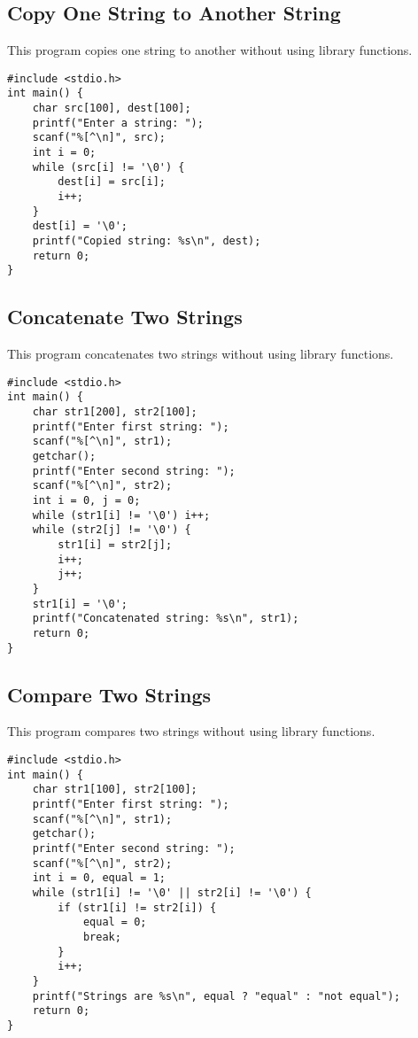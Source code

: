 \documentclass[a4paper,12pt]{article}
\begin{document}
\subsection{Copy One String to Another String}
This program copies one string to another without using library functions.
\begin{lstlisting}[caption={Copy One String to Another String}]
#include <stdio.h>
int main() {
    char src[100], dest[100];
    printf("Enter a string: ");
    scanf("%[^\n]", src);
    int i = 0;
    while (src[i] != '\0') {
        dest[i] = src[i];
        i++;
    }
    dest[i] = '\0';
    printf("Copied string: %s\n", dest);
    return 0;
}
\end{lstlisting}
\clearpage

\subsection{Concatenate Two Strings}
This program concatenates two strings without using library functions.
\begin{lstlisting}[caption={Concatenate Two Strings}]
#include <stdio.h>
int main() {
    char str1[200], str2[100];
    printf("Enter first string: ");
    scanf("%[^\n]", str1);
    getchar();
    printf("Enter second string: ");
    scanf("%[^\n]", str2);
    int i = 0, j = 0;
    while (str1[i] != '\0') i++;
    while (str2[j] != '\0') {
        str1[i] = str2[j];
        i++;
        j++;
    }
    str1[i] = '\0';
    printf("Concatenated string: %s\n", str1);
    return 0;
}
\end{lstlisting}
\clearpage

\subsection{Compare Two Strings}
This program compares two strings without using library functions.
\begin{lstlisting}[caption={Compare Two Strings}]
#include <stdio.h>
int main() {
    char str1[100], str2[100];
    printf("Enter first string: ");
    scanf("%[^\n]", str1);
    getchar();
    printf("Enter second string: ");
    scanf("%[^\n]", str2);
    int i = 0, equal = 1;
    while (str1[i] != '\0' || str2[i] != '\0') {
        if (str1[i] != str2[i]) {
            equal = 0;
            break;
        }
        i++;
    }
    printf("Strings are %s\n", equal ? "equal" : "not equal");
    return 0;
}
\end{lstlisting}
\clearpage
\end{document}
